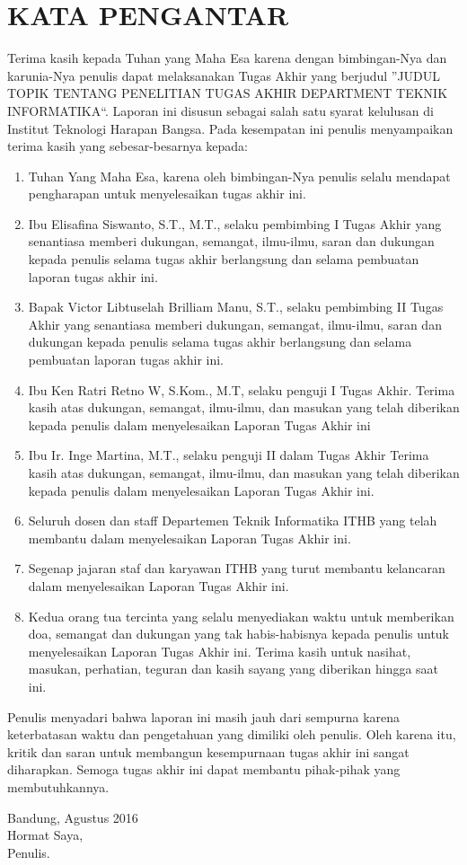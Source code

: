 \chapter*{KATA PENGANTAR}
{\raggedleft Terima kasih kepada Tuhan yang Maha Esa karena dengan bimbingan-Nya dan karunia-Nya penulis dapat melaksanakan Tugas Akhir yang berjudul \textquotedblright JUDUL TOPIK TENTANG PENELITIAN TUGAS AKHIR DEPARTMENT TEKNIK INFORMATIKA\textquotedblleft. Laporan ini disusun sebagai salah satu syarat kelulusan di Institut Teknologi Harapan Bangsa. Pada kesempatan ini penulis menyampaikan terima kasih yang sebesar-besarnya kepada:} \\
\begin{enumerate}
\item Tuhan Yang Maha Esa, karena oleh bimbingan-Nya penulis selalu mendapat pengharapan untuk menyelesaikan tugas akhir ini.
\item Ibu Elisafina Siswanto, S.T., M.T., selaku pembimbing I Tugas Akhir yang  senantiasa memberi dukungan, semangat, ilmu-ilmu, saran dan dukungan kepada penulis selama tugas akhir berlangsung dan selama pembuatan laporan tugas akhir ini.
\item Bapak Victor Libtuselah Brilliam Manu, S.T.,  selaku pembimbing II Tugas Akhir yang senantiasa memberi dukungan, semangat, ilmu-ilmu, saran dan dukungan kepada penulis selama tugas akhir berlangsung dan selama pembuatan laporan tugas akhir ini.
\item Ibu Ken Ratri Retno W, S.Kom., M.T, selaku penguji I Tugas Akhir. Terima kasih atas dukungan, semangat, ilmu-ilmu, dan masukan yang telah diberikan kepada penulis dalam menyelesaikan Laporan Tugas Akhir ini
\item Ibu Ir. Inge Martina, M.T., selaku penguji II dalam Tugas Akhir Terima kasih atas dukungan, semangat, ilmu-ilmu, dan masukan yang telah diberikan kepada penulis dalam menyelesaikan Laporan Tugas Akhir ini.
\item Seluruh dosen dan staff Departemen Teknik Informatika ITHB yang telah membantu dalam menyelesaikan Laporan Tugas Akhir ini.
\item Segenap jajaran staf dan karyawan ITHB yang turut membantu kelancaran dalam menyelesaikan Laporan Tugas Akhir ini.
\item Kedua orang tua tercinta yang selalu menyediakan waktu untuk memberikan doa, semangat dan dukungan yang tak habis-habisnya kepada penulis untuk menyelesaikan Laporan Tugas Akhir ini. Terima kasih untuk nasihat, masukan, perhatian, teguran dan kasih sayang yang diberikan hingga saat ini.
\\
\end{enumerate}
Penulis menyadari bahwa laporan ini masih jauh dari sempurna karena keterbatasan waktu dan pengetahuan yang dimiliki oleh penulis. Oleh karena itu, kritik dan saran untuk membangun kesempurnaan tugas akhir ini sangat diharapkan. Semoga tugas akhir ini dapat membantu pihak-pihak yang membutuhkannya.\\[1.5cm]  
\hfill
{\begin{flushright} Bandung, Agustus 2016\\[1.5cm] Hormat  Saya,\\ Penulis.\end{flushright}}
\newpage